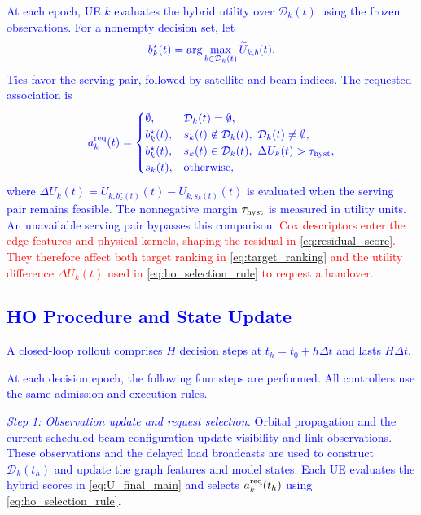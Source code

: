 \documentclass[10pt,letterpaper,journal]{IEEEtran}
\newcommand{\revnew}[1]{\textcolor{red}{#1}}
\begin{document}
\textcolor{blue}{At each epoch, UE $k$ evaluates the hybrid utility over $\mathcal D_k(t)$ using the frozen observations.
For a nonempty decision set, let}
\begin{equation}
\textcolor{blue}{
b_k^\star(t)
=
\arg\max_{b\in\mathcal D_k(t)}
\widetilde U_{k,b}(t).}
\label{eq:target_ranking}
\end{equation}
\textcolor{blue}{Ties favor the serving pair, followed by satellite and beam indices.
The requested association is}
\begin{equation}
\textcolor{blue}{
a_k^{\rm req}(t)=
\begin{cases}
\emptyset,
& \mathcal D_k(t)=\emptyset,\\
b_k^\star(t),
& s_k(t)\notin\mathcal D_k(t),\
  \mathcal D_k(t)\ne\emptyset,\\
b_k^\star(t),
& s_k(t)\in\mathcal D_k(t),\
  \Delta U_k(t)>\tau_{\rm hyst},\\
s_k(t),
& \text{otherwise},
\end{cases}
}
\label{eq:ho_selection_rule}
\end{equation}
\textcolor{blue}{where $\Delta U_k(t)= \widetilde U_{k,b_k^\star(t)}(t) -\widetilde U_{k,s_k(t)}(t)$ is evaluated when the serving pair remains feasible.
The nonnegative margin $\tau_{\rm hyst}$ is measured in utility units.
An unavailable serving pair bypasses this comparison.}
\revnew{Cox descriptors enter the edge features and physical kernels, shaping the residual in \eqref{eq:residual_score}. They therefore affect both target ranking in \eqref{eq:target_ranking} and the utility difference $\Delta U_k(t)$ used in \eqref{eq:ho_selection_rule} to request a handover.}



\subsection{\textcolor{blue}{HO Procedure and State Update}}
\label{subsec:ho_procedure}

\textcolor{blue}{
A closed-loop rollout comprises $H$ decision steps at $t_h=t_0+h\Delta t$ and lasts $H\Delta t$.
}

\textcolor{blue}{
At each decision epoch, the following four steps are performed.
All controllers use the same admission and execution rules.
}

\textcolor{blue}{
\textit{Step 1: Observation update and request selection.}
Orbital propagation and the current scheduled beam configuration update visibility and link observations.
These observations and the delayed load broadcasts are used to construct $\mathcal D_k(t_h)$ and update the graph features and model states.
Each UE evaluates the hybrid scores in \eqref{eq:U_final_main} and selects $a_k^{\rm req}(t_h)$ using \eqref{eq:ho_selection_rule}.
}
\end{document}
